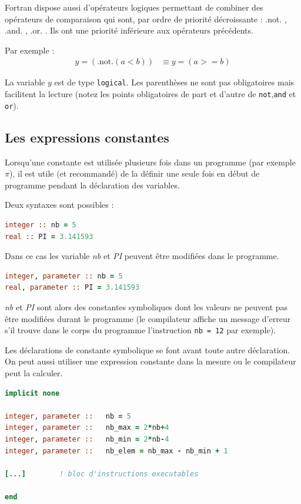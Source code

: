 \documentclass[a4paper,twoside]{article}
\begin{document}
Fortran dispose aussi d'opérateurs logiques permettant de 
combiner des opérateurs de compa\-rai\-son qui sont, par ordre de 
priorité décroissante : \og .not. \fg, \og .and. \fg, \og .or. \fg. Ils ont une 
priorité inférieure aux opérateurs précédents. 

Par exemple :
\begin{align}
y = (\mbox{.not.}(a<b)) &\equiv y = (a>=b) 
\end{align}

La variable $y$ est de type \texttt{logical}. Les parenthèses ne sont 
pas obligatoires mais facilitent la lecture (notez les points 
obligatoires de part et d'autre de \texttt{not},\texttt{and} et \texttt{or}).

\subsection{Les expressions constantes}\label{sec:constantes}
Lorsqu'une constante est utilisée plusieurs fois dans un programme (par exemple $\pi$), il est utile (et recommandé) de la définir une seule fois en début de programme pendant la déclaration des variables.
 
Deux syntaxes sont possibles :
\begin{lstlisting}[language=Fortran]
integer :: nb = 5
real :: PI = 3.141593
\end{lstlisting}
Dans ce cas les variable \emph{nb} et \emph{PI} peuvent être modifiées dans le programme.

\begin{lstlisting}[language=Fortran]
integer, parameter :: nb = 5
real, parameter :: PI = 3.141593
\end{lstlisting}
\emph{nb} et \emph{PI} sont alors des constantes symboliques dont les valeurs ne peuvent pas être modi\-fiées durant le programme (le compilateur affiche un message d'erreur s'il trouve dans le corps du programme l'instruction \texttt{nb = 12} par exemple).

Les déclarations de constante symbolique se font avant toute autre déclaration. On peut aussi utiliser une expression constante dans la mesure ou le compilateur peut la calculer. 

\begin{lstlisting}[language=Fortran]
implicit none
  
integer, parameter ::   nb = 5
integer, parameter ::   nb_max = 2*nb+4
integer, parameter ::   nb_min = 2*nb-4
integer, parameter ::   nb_elem = nb_max - nb_min + 1

[...]        ! bloc d'instructions executables 

end
\end{lstlisting}
\end{document}
